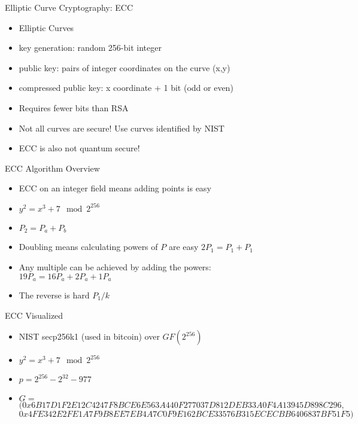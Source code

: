 \begin{frame}{Elliptic Curve Cryptography: ECC}
    \begin{itemize}
        \item Elliptic Curves
        \item key generation: random 256-bit integer
        \item public key: pairs of integer coordinates on the curve (x,y)
        \item compressed public key: x coordinate + 1 bit (odd or even)
        \item Requires fewer bits than RSA
        \item Not all curves are secure! Use curves identified by NIST
        \item ECC is also not quantum secure!
    \end{itemize}
\end{frame}

\begin{frame}{ECC Algorithm Overview}
    \begin{itemize}
        \item ECC on an integer field means adding points is easy
        \item $y^2 = x^3 + 7 \mod 2^{256}$
        \item $P_2 = P_a + P_b$ 
        \item Doubling means calculating powers of $P$ are easy $2P_1 = P_1 + P_1$
        \item Any multiple can be achieved by adding the powers: $19P_a = 16P_a + 2P_a + 1P_a$
        \item The reverse is hard $P_1 / k$
    \end{itemize}
\end{frame}

\begin{frame}{ECC Visualized}
    \begin{itemize}
        \item NIST secp256k1 (used in bitcoin) over $GF(2^{256})$
        \item $y^2 = x^3 + 7 \mod 2^{256}$
        \item $p = 2^{256} - 2^{32} - 977$
        \item $G =$
          $( 0x6B17D1F2E12C4247F8BCE6E563A440F277037D812DEB33A0F4A13945D898C296,$ \\
          $  0x4FE342E2FE1A7F9B8EE7EB4A7C0F9E162BCE33576B315ECECBB6406837BF51F5 )$
    \end{itemize}
\end{frame}

